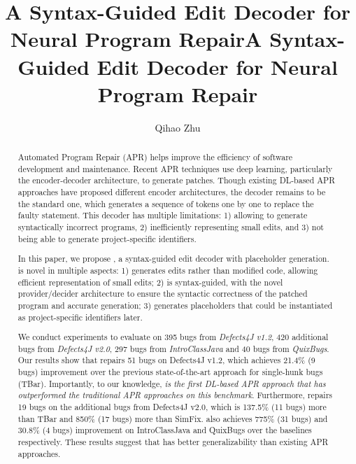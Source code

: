\title{A Syntax-Guided Edit Decoder for Neural Program Repair}



\title{A Syntax-Guided Edit Decoder for Neural Program Repair}

\begin{abstract}
  Automated Program Repair (APR) helps improve the efficiency of software development and maintenance. Recent APR techniques use deep learning, particularly the encoder-decoder architecture, to generate patches.
  Though existing DL-based APR approaches have proposed different encoder architectures, the decoder remains to be the standard one, which generates a sequence of tokens one by one to replace the faulty statement.
  This decoder has multiple limitations: 1) allowing to generate syntactically incorrect programs, 2) inefficiently representing small edits, and 3) not being able to generate project-specific identifiers.
  
  In this paper, we propose \techname, a syntax-guided edit decoder with placeholder generation. \techname is novel in multiple aspects: 1) \techname generates edits rather than modified code, allowing efficient representation of small edits; 2) \techname is syntax-guided, with the novel provider/decider architecture to ensure the syntactic correctness of the patched program and accurate generation;  3) \techname generates placeholders that could be instantiated as project-specific identifiers later.

  We conduct experiments to evaluate \techname on 395 bugs from \textit{Defects4J v1.2}, 420 additional bugs from \textit{Defects4J v2.0}, 297 bugs from \textit{IntroClassJava} and 40 bugs from \textit{QuixBugs}. Our results show that \techname repairs 51 bugs on Defects4J v1.2, which achieves 21.4\% (9 bugs) improvement over the previous state-of-the-art approach for single-hunk bugs (TBar). Importantly, to our knowledge, \textit{\techname is the first DL-based APR approach that has outperformed the traditional APR approaches on this benchmark}. Furthermore, \techname repairs 19 bugs on the additional bugs from Defects4J v2.0, which is 137.5\% (11 bugs) more than TBar  and 850\% (17 bugs) more than SimFix. \techname also achieves 775\% (31 bugs) and 30.8\% (4 bugs) improvement on IntroClassJava and QuixBugs over the baselines respectively. These results suggest that \techname has better generalizability than existing APR approaches.
\end{abstract}

\author{Qihao Zhu}

